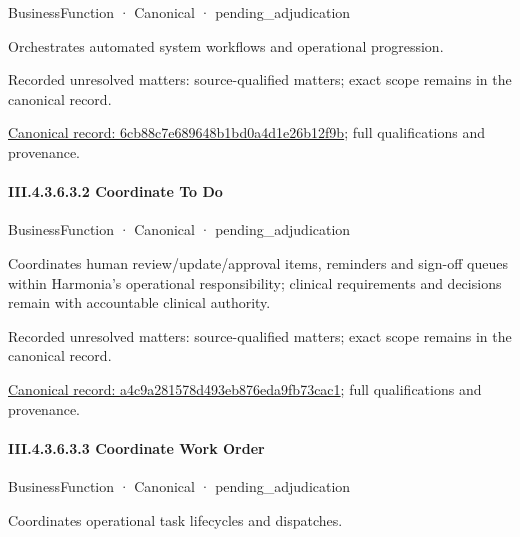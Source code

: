 \label{element:6cb88c7e689648b1bd0a4d1e26b12f9b}
{\small BusinessFunction · Canonical · pending\_adjudication}\par

Orchestrates automated system workflows and operational progression.


{\small Recorded unresolved matters: source-qualified matters; exact scope remains in the canonical record.}\par
{\footnotesize \href{../../../../continuum/business/business-function/6cb88c7e689648b1bd0a4d1e26b12f9b.md}{Canonical record: 6cb88c7e689648b1bd0a4d1e26b12f9b}; full qualifications and provenance.}\par
\paragraph*{III.4.3.6.3.2 Coordinate To Do}
\label{navigation:III.4.3.6.3.2}

\label{element:a4c9a281578d493eb876eda9fb73cac1}
{\small BusinessFunction · Canonical · pending\_adjudication}\par

Coordinates human review/update/approval items, reminders and sign-off queues within Harmonia's operational responsibility; clinical requirements and decisions remain with accountable clinical authority.


{\small Recorded unresolved matters: source-qualified matters; exact scope remains in the canonical record.}\par
{\footnotesize \href{../../../../continuum/business/business-function/a4c9a281578d493eb876eda9fb73cac1.md}{Canonical record: a4c9a281578d493eb876eda9fb73cac1}; full qualifications and provenance.}\par
\paragraph*{III.4.3.6.3.3 Coordinate Work Order}
\label{navigation:III.4.3.6.3.3}

\label{element:0161308bad6945b5bcfdeea5519341cd}
{\small BusinessFunction · Canonical · pending\_adjudication}\par

Coordinates operational task lifecycles and dispatches.



